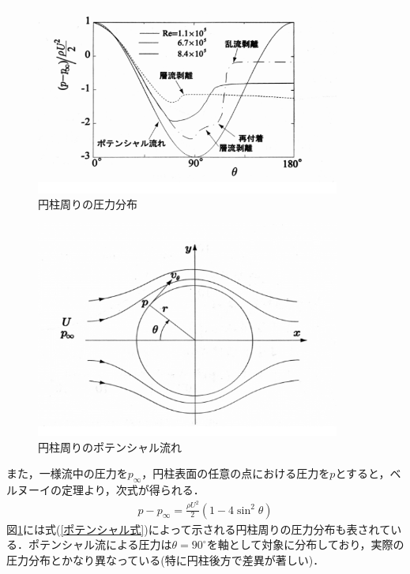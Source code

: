 \documentclass[a4paper,11pt,uplatex]{jsarticle}
\begin{document}
\begin{figure}[H]
  \begin{center}
    \includegraphics[width = 10cm]{pic/円柱周りの圧力.png}
    \caption{円柱周りの圧力分布\cite{s4}}
    \label{円柱周りの圧力}
  \end{center}
\end{figure}
\begin{figure}[H]
  \begin{center}
    \includegraphics[width = 10cm]{pic/円柱周りのポテンシャル.png}
    \caption{円柱周りのポテンシャル流れ\cite{s4}}
    \label{ポテンシャル流れ}
  \end{center}
\end{figure}

また，一様流中の圧力を$p_{\infty}$，円柱表面の任意の点における圧力を$p$とすると，ベルヌーイの定理より，次式が得られる．
\begin{align}
  \label{ポテンシャル式}
  p - p_{\infty} = \frac{\rho U^2}{2}(1 - 4 \sin^2 \theta)
\end{align}
図\ref{円柱周りの圧力}には式(\ref{ポテンシャル式})によって示される円柱周りの圧力分布も表されている．ポテンシャル流による圧力は$\theta = 90^{\circ}$を軸として対象に分布しており，実際の圧力分布とかなり異なっている(特に円柱後方で差異が著しい)．
\end{document}
